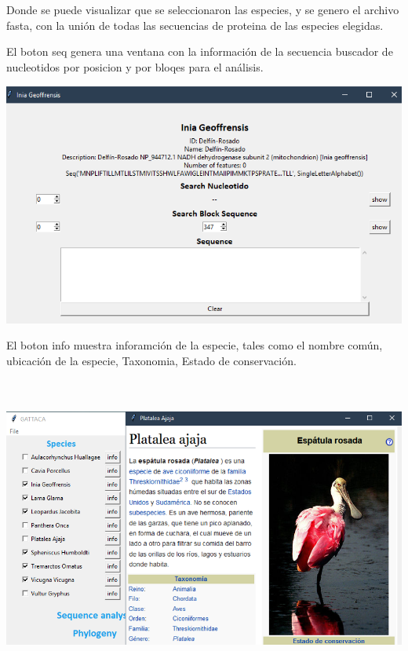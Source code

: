 \documentclass[a4paper]{article}
\begin{document}
Donde se puede visualizar que se seleccionaron las especies, y se genero el archivo fasta, con la unión de todas las secuencias de proteina de las especies elegidas.

El boton seq genera una ventana con la información de la secuencia buscador de nucleotidos por posicion y por bloqes para el análisis.

\begin{center}
	\includegraphics[width=15cm,height=8cm]{boton-seq.png}
\end{center}

El boton info muestra inforamción de la especie, tales como el nombre común, ubicación de la especie, Taxonomia, Estado de conservación.

\begin{center}
	\includegraphics[width=17cm,height=10cm]{info.png}
\end{center}
\end{document}
